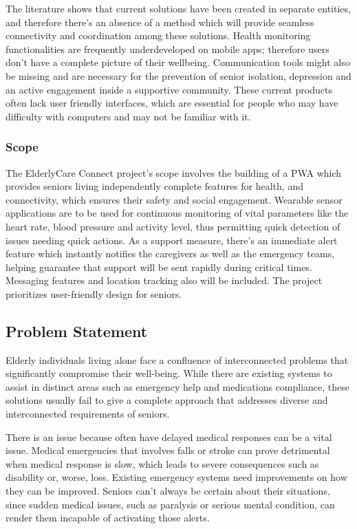 \documentclass[a4paper, 12pt]{article}
\begin{document}
The literature shows that current solutions have been created in separate entities, and therefore there's an absence of a method which will provide seamless connectivity and coordination among these solutions. Health monitoring functionalities are frequently underdeveloped on mobile apps; therefore users don’t have a complete picture of their wellbeing.  Communication tools might also be missing and are necessary for the prevention of senior isolation, depression and an active engagement inside a supportive community.   These current products often lack user friendly interfaces, which are essential for people who may have difficulty with computers and may not be familiar with it.

\subsubsection{Scope}

The ElderlyCare Connect project's scope involves the building of a PWA which provides seniors living independently complete features for health, and connectivity, which ensures their safety and social engagement. Wearable sensor applications are to be used for continuous monitoring of vital parameters like the heart rate, blood pressure and activity level, thus permitting quick detection of issues needing quick actions. As a support measure, there's an immediate alert feature which instantly notifies the caregivers as well as the emergency teams, helping guarantee that support will be sent rapidly during critical times. Messaging features and location tracking also will be included. The project prioritizes user-friendly design for seniors.
 
\subsection {Problem Statement}
Elderly individuals living alone face a confluence of interconnected problems that significantly compromise their well-being. While there are existing systems to assist in distinct areas such as emergency help and medications compliance, these solutions usually fail to give a complete approach that addresses diverse and interconnected requirements of seniors.

There is an issue because often have delayed medical responses can be a vital issue. Medical emergencies that involves falls or stroke can prove detrimental when medical response is slow, which leads to severe consequences such as disability or, worse, loss. Existing emergency systems need improvements on how they can be improved. Seniors can't always be certain about their situations, since sudden medical issues, such as paralysis or serious mental condition, can render them incapable of activating those alerts.
\end{document}
